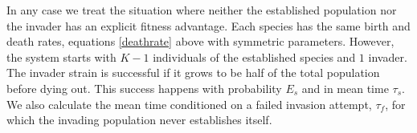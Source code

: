 In any case we treat the situation where neither the established population nor the invader has an explicit fitness advantage. 
Each species has the same birth and death rates, equations \ref{deathrate} above with symmetric parameters. 
However, the system starts with $K-1$ individuals of the established species and $1$ invader. 
The invader strain is successful if it grows to be half of the total population before dying out. 
This success happens with probability $E_s$ and in mean time $\tau_s$. 
We also calculate the mean time conditioned on a failed invasion attempt, $\tau_f$, for which the invading population never establishes itself. 

